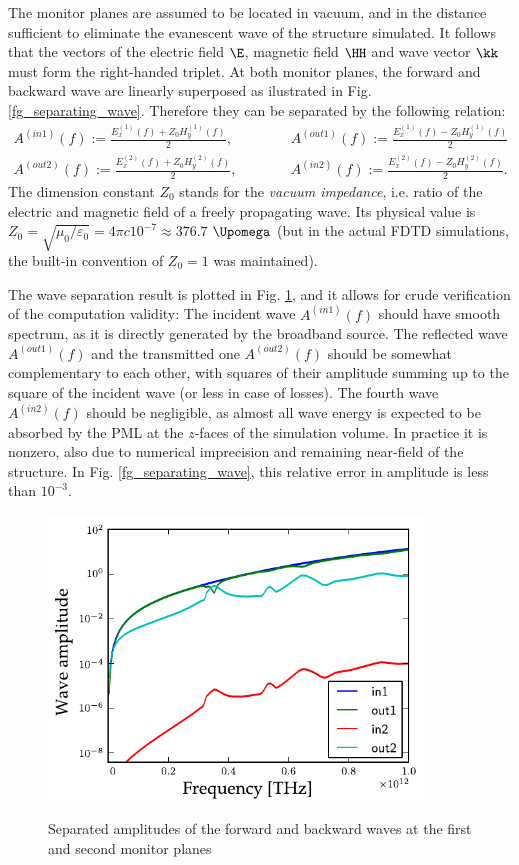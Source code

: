 The monitor planes are assumed to be located in vacuum, and in the distance sufficient to eliminate the evanescent wave of the structure simulated. It follows that the vectors of the electric field $\E$, magnetic field $\HH$ and wave vector $\kk$ must form the right-handed triplet. %
At both monitor planes, the forward and backward wave are linearly superposed as ilustrated in Fig. \ref{fg_separating_wave}. Therefore they can be separated by the following relation: 
\begin{equation} 
	\begin{split}
		A^{(in 1)}(f)  := \frac{E_{x}^{(1)}(f) + Z_0 H_{y}^{(1)}(f)}{2}, \quad \quad \quad & A^{(out 1)}(f) := \frac{E_{x}^{(1)}(f) - Z_0 H_{y}^{(1)}(f)}{2}\\
		A^{(out 2)}(f) := \frac{E_{x}^{(2)}(f) + Z_0 H_{y}^{(2)}(f)}{2}, \quad \quad \quad & A^{(in 2)}(f)  := \frac{E_{x}^{(2)}(f) - Z_0 H_{y}^{(2)}(f)}{2}. 
	\end{split} 
\label{eq_separate_ampli}\end{equation}
The dimension constant $Z_0$ stands for the \textit{vacuum impedance}, i.e. ratio of the electric and magnetic field of a freely propagating wave. Its physical value is $Z_0 = \sqrt{\mu_0/\varepsilon_0} = 4\pi c 10^{-7} \approx 376.7$ $\Upomega$ (but in the actual FDTD simulations, the built-in convention of $Z_0 = 1$ was maintained).

The wave separation result is plotted in Fig. \ref{fg_ampli}, and it allows for crude verification of the computation validity: The incident wave $A^{(in 1)}(f)$ should have smooth spectrum, as it is directly generated by the broadband source. The reflected wave $A^{(out 1)}(f)$ and the transmitted one $A^{(out 2)}(f)$ should be somewhat complementary to each other, with squares of their amplitude summing up to the square of the incident wave (or less in case of losses). The fourth wave $A^{(in 2)}(f)$ should be negligible, as almost all wave energy is expected to be absorbed by the PML at the $z$-faces of the simulation volume. In practice it is nonzero, also due to numerical imprecision and remaining near-field of the structure. In Fig. \ref{fg_separating_wave}, this relative error in amplitude is less than $10^{-3}$.
\begin{figure}[h] \caption{Separated amplitudes of the forward and backward waves at the first and second monitor planes}  \centering \includegraphics[width=10cm]{img/sim_ampli_debug_band.pdf}\label{fg_ampli} \end{figure} 

